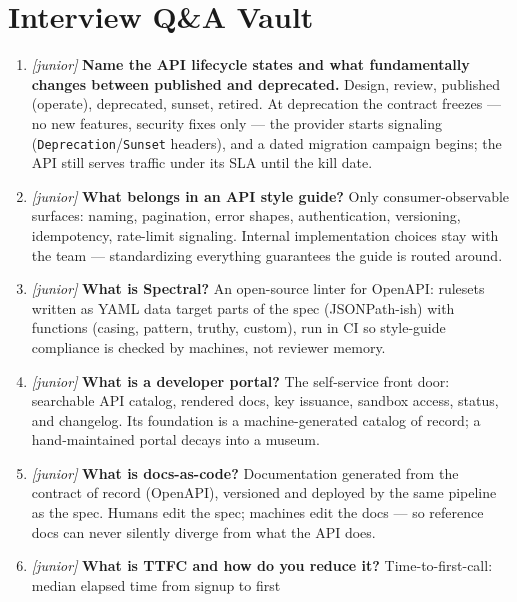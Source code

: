 \section{Interview Q\&A Vault}
\label{sec:ch20-interviews}

\begin{enumerate}[label=\textbf{Q\arabic*.}, leftmargin=1.7cm]
  \item \emph{[junior]} \textbf{Name the API lifecycle states and what
        fundamentally changes between \textsf{published} and
        \textsf{deprecated}.} Design, review, published (operate),
        deprecated, sunset, retired. At deprecation the contract freezes
        --- no new features, security fixes only --- the provider starts
        signaling (\texttt{Deprecation}/\texttt{Sunset} headers), and a
        dated migration campaign begins; the API still serves traffic
        under its SLA until the kill date.
  \item \emph{[junior]} \textbf{What belongs in an API style guide?}
        Only consumer-observable surfaces: naming, pagination, error
        shapes, authentication, versioning, idempotency, rate-limit
        signaling. Internal implementation choices stay with the team ---
        standardizing everything guarantees the guide is routed around.
  \item \emph{[junior]} \textbf{What is Spectral?} An open-source linter
        for OpenAPI: rulesets written as YAML data target parts of the
        spec (JSONPath-ish) with functions (casing, pattern, truthy,
        custom), run in CI so style-guide compliance is checked by
        machines, not reviewer memory.
  \item \emph{[junior]} \textbf{What is a developer portal?} The
        self-service front door: searchable API catalog, rendered docs,
        key issuance, sandbox access, status, and changelog. Its
        foundation is a machine-generated catalog of record; a
        hand-maintained portal decays into a museum.
  \item \emph{[junior]} \textbf{What is docs-as-code?} Documentation
        generated from the contract of record (OpenAPI), versioned and
        deployed by the same pipeline as the spec. Humans edit the spec;
        machines edit the docs --- so reference docs can never silently
        diverge from what the API does.
  \item \emph{[junior]} \textbf{What is TTFC and how do you reduce it?}
        Time-to-first-call: median elapsed time from signup to first

\end{enumerate}
